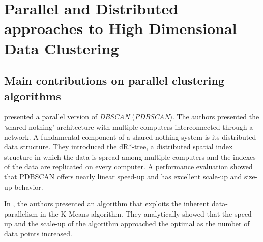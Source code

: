 \documentclass[10pt]{article}
\begin{document}
\section{Parallel and Distributed approaches to High Dimensional Data Clustering}

\subsection{Main contributions on parallel clustering algorithms}

\citep{XJK99} presented a parallel version of \textit{DBSCAN} (\textit{PDBSCAN}). The authors presented the ‘shared-nothing’ architecture with multiple computers interconnected through a network. A fundamental component of a shared-nothing system is its distributed data structure. They introduced the dR*-tree, a distributed spatial index structure in which the data is spread among multiple computers and the indexes of the data are replicated on every computer. 
A performance evaluation showed that PDBSCAN offers nearly linear speed-up and has excellent scale-up and size-up behavior. 

In \citep{DM99}, the authors presented an algorithm that exploits the inherent data-parallelism in the K-Means algorithm. They analytically showed that the speed-up and the scale-up of the algorithm approached the optimal as the number of data points increased.
\end{document}
